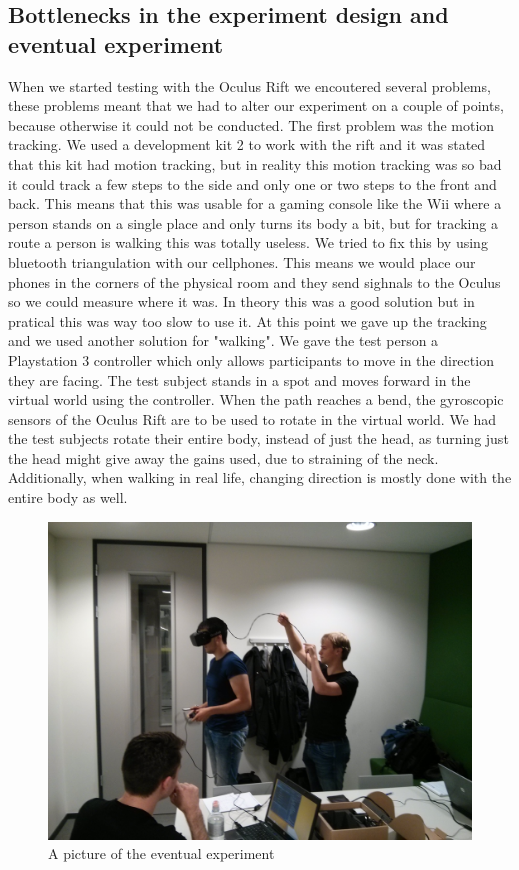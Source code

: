 \subsection{Bottlenecks in the experiment design and eventual experiment}
When we started testing with the Oculus Rift we encoutered several problems, these problems meant that we had to alter our experiment on a couple of points, because otherwise it could not be conducted. The first problem was the motion tracking. We used a development kit 2 to work with the rift and it was stated that this kit had motion tracking, but in reality this motion tracking was so bad it could track a few steps to the side and only one or two steps to the front and back. This means that this was usable for a gaming console like the Wii where a person stands on a single place and only turns its body a bit, but for tracking a route a person is walking this was totally useless. We tried to fix this by using bluetooth triangulation with our cellphones. This means we would place our phones in the corners of the physical room and they send sighnals to the Oculus so we could measure where it was. In theory this was a good solution but in pratical this was way too slow to use it. At this point we gave up the tracking and we used another solution for "walking". We gave the test person a Playstation 3 controller which only allows participants to move in the direction they are facing.
The test subject stands in a spot and moves forward in the virtual world using the controller.
When the path reaches a bend, the gyroscopic sensors of the Oculus Rift are to be used to rotate in the virtual world.
We had the test subjects rotate their entire body, instead of just the head, as turning just the head might give away the gains used, due to straining of the neck.
Additionally, when walking in real life, changing direction is mostly done with the entire body as well.\\
\begin{figure}[htb]
	\centering
	\includegraphics[width=\linewidth]{sections/finalreport/images/experiment.jpg}	
	\caption{A picture of the eventual experiment}
\end{figure}

